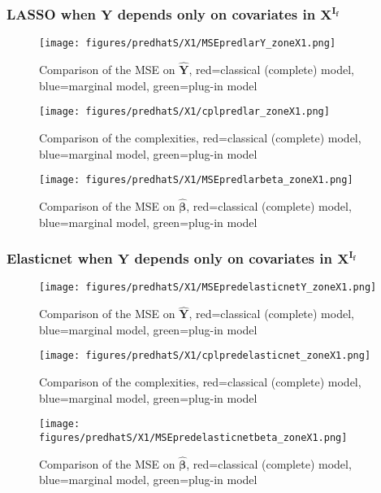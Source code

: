 \documentclass[12pt,a4paper]{report}
\begin{document}
\subsubsection{LASSO when $\boldsymbol{Y}$ depends only on covariates in $\boldsymbol{X^{I_f}}$}

	\begin{figure}[h!]
	\centering
		  \texttt{[image: figures/predhatS/X1/MSEpredlarY\_zoneX1.png]}
		\caption{Comparison of the MSE on $\hat{\boldsymbol{Y}}$, red=classical (complete) model, blue=marginal model, green=plug-in model}\label{MSEpredlarY_zoneX1}
	\end{figure}
	\begin{figure}[h!]
	\centering
		  \texttt{[image: figures/predhatS/X1/cplpredlar\_zoneX1.png]}
		\caption{Comparison of the complexities, red=classical (complete) model, blue=marginal model, green=plug-in model}\label{cplpredlar_zoneX1}
	\end{figure}
	\begin{figure}[h!]
	\centering
		  \texttt{[image: figures/predhatS/X1/MSEpredlarbeta\_zoneX1.png]}
		\caption{Comparison of the MSE on $\hat{\boldsymbol{\beta}}$, red=classical (complete) model, blue=marginal model, green=plug-in model}\label{MSEpredlarbeta_zoneX1}
	\end{figure}
	\FloatBarrier
\newpage
\subsubsection{Elasticnet when $\boldsymbol{Y}$ depends only on covariates in $\boldsymbol{X^{I_f}}$}

	\begin{figure}[h!]
	\centering
		  \texttt{[image: figures/predhatS/X1/MSEpredelasticnetY\_zoneX1.png]}
		\caption{Comparison of the MSE on $\hat{\boldsymbol{Y}}$, red=classical (complete) model, blue=marginal model, green=plug-in model}\label{MSEpredelasticnetY_zoneX1}
	\end{figure}
	\begin{figure}[h!]
	\centering
		  \texttt{[image: figures/predhatS/X1/cplpredelasticnet\_zoneX1.png]}
		\caption{Comparison of the complexities, red=classical (complete) model, blue=marginal model, green=plug-in model}\label{cplpredelasticnet_zoneX1}
	\end{figure}
	\begin{figure}[h!]
	\centering
		  \texttt{[image: figures/predhatS/X1/MSEpredelasticnetbeta\_zoneX1.png]}
		\caption{Comparison of the MSE on $\hat{\boldsymbol{\beta}}$, red=classical (complete) model, blue=marginal model, green=plug-in model}\label{MSEpredelasticnetbeta_zoneX1}
	\end{figure}
	\FloatBarrier
\newpage
\end{document}
